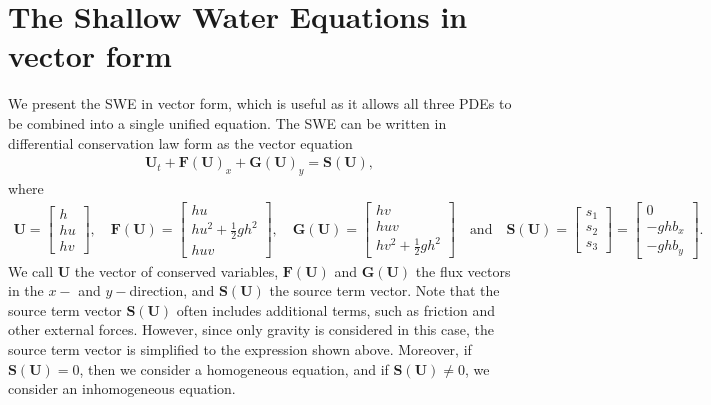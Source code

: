 \section{The Shallow Water Equations in vector form}
We present the SWE in vector form, which is useful as it allows all three PDEs to be combined into a single unified equation.
The SWE can be written in differential conservation law form as the vector equation
\begin{align}\label{eq:vector_form_2D}
    \mathbf{U}_t + \mathbf{F(U)}_x + \mathbf{G(U)}_y = \mathbf{S(U)},
\end{align}
where 
\begin{align*}
    \mathbf{U} = \begin{bmatrix}
        h \\
        hu \\
        hv
    \end{bmatrix},
    \quad 
    \mathbf{F(U)} = \begin{bmatrix}
        hu \\
        hu^2 + \frac{1}{2}gh^2 \\
        huv
    \end{bmatrix},
    \quad
    \mathbf{G(U)} = \begin{bmatrix}
        hv \\
        huv \\
        hv^2 + \frac{1}{2}gh^2
    \end{bmatrix}
    \quad \text{and} \quad
    \mathbf{S(U)} = \begin{bmatrix}
        s_1 \\
        s_2 \\
        s_3
    \end{bmatrix} = 
    \begin{bmatrix}
        0 \\
        -gh b_x \\
        -gh b_y
    \end{bmatrix}
    .
\end{align*}
We call $\mathbf{U}$ the vector of conserved variables, $\mathbf{F(U)}$ and $\mathbf{G(U)}$ the flux vectors in the $x-$ and $y-$direction, and $\mathbf{S(U)}$ the source term vector.
Note that the source term vector $\mathbf{S(U)}$ often includes additional terms, such as friction and other external forces.
However, since only gravity is considered in this case, the source term vector is simplified to the expression shown above.
Moreover, if $\mathbf{S(U)} = 0$, then we consider a homogeneous equation, and if $\mathbf{S(U)} \neq 0$, we consider an inhomogeneous equation.

